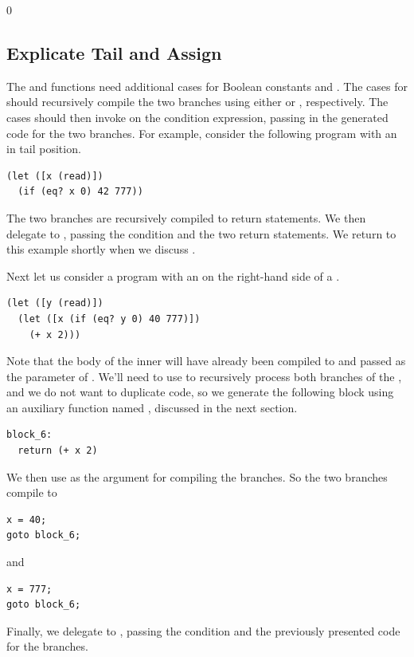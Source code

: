 \documentclass[7x10]{TimesAPriori_MIT}%
\def\racketEd{0}
\def\edition{1}
\numberwithin{theorem}{chapter}
\numberwithin{definition}{chapter}
\numberwithin{equation}{chapter}
\begin{document}
{\if\edition\racketEd

\subsection{Explicate Tail and Assign}
  
The  and  functions need
additional cases for Boolean constants and .  The cases for
 should recursively compile the two branches using either
 or , respectively. The
cases should then invoke  on the condition
expression, passing in the generated code for the two branches.  For
example, consider the following program with an  in tail
position.
\begin{lstlisting}
(let ([x (read)])
  (if (eq? x 0) 42 777))
\end{lstlisting}
The two branches are recursively compiled to return statements.  We
then delegate to , passing the condition
 and the two return statements.  We return to this
example shortly when we discuss .

Next let us consider a program with an  on the right-hand
side of a .
\begin{lstlisting}
(let ([y (read)])
  (let ([x (if (eq? y 0) 40 777)])
    (+ x 2)))
\end{lstlisting}
Note that the body of the inner  will have already been
compiled to  and passed as the 
parameter of . We'll need to use 
to recursively process both branches of the , and we do not
want to duplicate code, so we generate the following block using an
auxiliary function named , discussed in the next
section.
\begin{lstlisting}
block_6:
  return (+ x 2)
\end{lstlisting}
We then use  as the  argument for
compiling the branches. So the two branches compile to
\begin{center}
\begin{minipage}{0.2\textwidth}
\begin{lstlisting}
x = 40;
goto block_6;
\end{lstlisting}
\end{minipage}
\hspace{0.5in} and \hspace{0.5in}
\begin{minipage}{0.2\textwidth}
\begin{lstlisting}
x = 777;
goto block_6;
\end{lstlisting}
\end{minipage}
\end{center}
Finally, we delegate to , passing the condition
 and the previously presented code for the branches.

}
\end{document}
